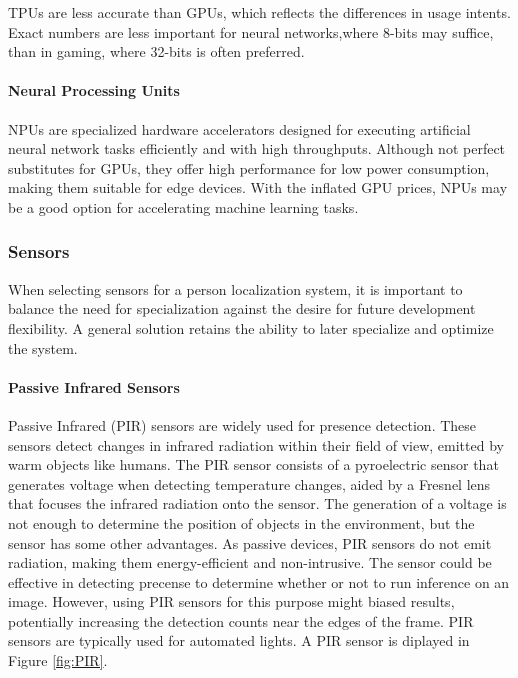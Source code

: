 TPUs are less accurate than GPUs, which reflects the differences in usage intents. Exact numbers are less important for neural networks,where 8-bits may suffice, than in gaming, where 32-bits is often preferred.

\paragraph{Neural Processing Units}
NPUs are specialized hardware accelerators designed for executing artificial neural network tasks efficiently and with high throughputs. Although not perfect substitutes for GPUs, they offer high performance for low power consumption, making them suitable for edge devices. With the inflated GPU prices, NPUs may be a good option for accelerating machine learning tasks. 

\subsubsection{Sensors}
\label{sec:sensors}
When selecting sensors for a person localization system, it is important to balance the need for specialization against the desire for future development flexibility. A general solution retains the ability to later specialize and optimize the system.


\paragraph{Passive Infrared Sensors}
Passive Infrared (PIR) sensors are widely used for presence detection. These sensors detect changes in infrared radiation within their field of view, emitted by warm objects like humans. The PIR sensor consists of a pyroelectric sensor that generates voltage when detecting temperature changes, aided by a Fresnel lens that focuses the infrared radiation onto the sensor. The generation of a voltage is not enough to determine the position of objects in the environment, but the sensor has some other advantages. As passive devices, PIR sensors do not emit radiation, making them energy-efficient and non-intrusive. The sensor could be effective in detecting precense to determine whether or not to run inference on an image. However, using PIR sensors for this purpose might biased results, potentially increasing the detection counts near the edges of the frame. PIR sensors are typically used for automated lights. A PIR sensor is diplayed in Figure \ref{fig:PIR}.

